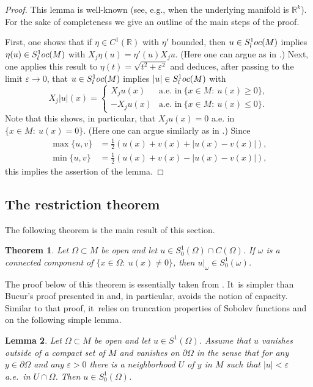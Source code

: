 \documentclass[11pt]{article}
\newcommand{\loc}{\textup{loc}}
\newtheorem{theorem}{Theorem}[section]
\newtheorem{lemma}[theorem]{Lemma}
\theoremstyle{definition}
\let\epsilon\varepsilon
\newcommand{\1}{\mathbbm{1}}
\newcommand{\R}{\mathbb{R}}
\numberwithin{equation}{section}
\begin{document}
\begin{proof}
This lemma is well-known (see, e.g., \cite[Lem.\,3.5]{GaNh} when the underlying manifold is $\R^k$). For the sake of completeness we give an outline of the main steps of the proof.

First, one shows that if $\eta\in C^1(\R)$ with $\eta'$ bounded, then $u\in S^1_\loc(M)$ implies $\eta(u)\in S^1_\loc(M)$ with $X_j\eta(u) = \eta'(u)X_j u$. (Here one can argue as in \cite[Th.\,1.18]{HeKiMa}.) Next, one applies this result to $\eta(t)=\sqrt{t^2+\epsilon^2}$ and deduces, after passing to the limit $\epsilon\to 0$, that $u\in S^1_\loc(M)$ implies $|u|\in S^1_\loc(M)$ with
\[
X_j|u|(x) =
\begin{cases}
X_j u(x) & \text{a.e.\ in}\ \{ x\in M:\ u(x)\geq 0\},\\
- X_ju(x) & \text{a.e.\ in}\ \{ x\in M:\ u(x)\leq 0 \}.
\end{cases}
\]
Note that this shows, in particular, that $X_j u(x)=0$ a.e. in $\{x\in M:\ u(x)=0\}$. (Here one can argue similarly as in \cite[Lem.\,1.19]{HeKiMa}.) Since
\begin{align*}
\max\{u,v\} & = \tfrac12(u(x)+v(x) + |u(x)-v(x)|), \\
\min\{u,v\} & = \tfrac12(u(x)+v(x) - |u(x)-v(x)|),
\end{align*}
this implies the assertion of the lemma.
\end{proof}

\subsection{The restriction theorem}
The following theorem is the main result of this section.

\begin{theorem}\label{restriction}
Let $\Omega\subset M$ be open and let $u\in S^1_0(\Omega)\cap C(\Omega)$. If $\omega$ is a connected component of $\{ x\in\Omega:\ u(x)\neq 0\}$, then $u|_\omega \in S^1_0(\omega)$.
\end{theorem}

The proof below of this theorem is essentially taken from \cite{MP}. It~is simpler than Bucur's proof presented in \cite{LMP} and, in particular, avoids the notion of capacity. Similar to that proof, it~relies on truncation properties of Sobolev functions and on the following simple lemma.

\begin{lemma}\label{s10easy}
Let $\Omega\subset M$ be open and let $u\in S^1(\Omega)$. Assume that $u$ vanishes outside of a compact set of $M$ and vanishes on $\partial\Omega$ in the sense that for any $y\in\partial\Omega$ and any $\epsilon>0$ there is a neighborhood $U$ of $y$ in $M$ such that $|u|<\epsilon$ a.e.\ in $U\cap\Omega$. Then $u\in S^1_0(\Omega)$.
\end{lemma}
\end{document}
